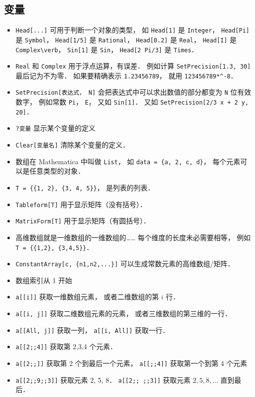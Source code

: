 \subsection{变量}
\begin{itemize}
\item \verb|Head[...]| 可用于判断一个对象的类型， 如 \verb|Head[1]| 是 \verb|Integer|， \verb|Head[Pi]| 是 \verb|Symbol|， \verb|Head[1/5]| 是 \verb|Rational|， \verb|Head[0.2]| 是 \verb|Real|， \verb|Head[I]| 是 \verb|Complex\verb|， \verb|Sin[1]|  是 \verb|Sin|， \verb|Head[2 Pi/3]| 是 \verb|Times|．
\item \verb|Real| 和 \verb|Complex| 用于浮点运算，有误差． 例如计算 \verb|SetPrecision[1.3, 30]| 最后记为不为零． 如果要精确表示 \verb|1.23456789|， 就用 \verb|123456789*^-8|．
\item \verb|SetPrecision[表达式， N]| 会把表达式中可以求出数值的部分都变为 \verb|N| 位有效数字， 例如常数 \verb|Pi|， \verb|E|， 又如 \verb|Sin[1]|． 又如 \verb|SetPrecision[2/3 x + 2 y, 20]|．
\item \verb|?变量| 显示某个变量的定义
\item \verb|Clear[变量名]| 清除某个变量的定义．
\item 数组在 Mathematica 中叫做 \verb|List|， 如 \verb|data = {a, 2, c, d}|， 每个元素可以是任意类型的对象．
\item \verb|T = {{1, 2}, {3, 4, 5}}|， 是列表的列表．
\item \verb|Tableform[T]| 用于显示矩阵（没有括号）．
\item \verb|MatrixForm[T]| 用于显示矩阵（有圆括号）．
\item 高维数组就是一维数组的一维数组的…… 每个维度的长度未必需要相等， 例如 \verb|T = {{1,2}, {3,4,5}}|．
\item \verb|ConstantArray[c, {n1,n2,...}]| 可以生成常数元素的高维数组/矩阵．
\item 数组索引从 1 开始
\item \verb|a[[i]]| 获取一维数组元素， 或者二维数组的第 $i$ 行．
\item \verb|a[[i, j]]| 获取二维数组元素的元素， 或者三维数组的第三维的一行．
\item \verb|a[[All, j]]| 获取一列， \verb|a[[i, All]]| 获取一行．
\item \verb|a[[2;;4]]| 获取第 2,3,4 个元素．
\item \verb|a[[2;;]]| 获取第 2 个到最后一个元素， \verb|a[[;;4]]| 获取第一个到第 4 个元素
\item \verb|a[[2;;9;;3]]| 获取元素 2, 5, 8． \verb|a[[2;; ;;3]]| 获取元素 $2, 5, 8, \dots$ 直到最后．
\end{itemize}

